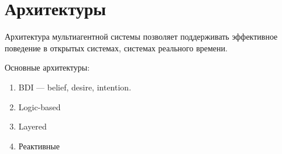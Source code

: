\documentclass[12pt]{report}
\begin{document}
        \section {Архитектуры}
            Архитектура мультиагентной системы позволяет поддерживать эффективное поведение в открытых системах, системах реального времени.
            
            Основные архитектуры:
            \begin{enumerate}
                \item BDI --- belief, desire, intention. 
                \item Logic-based
                \item Layered
                \item Реактивные 
            \end{enumerate}
        


        
\end{document}
